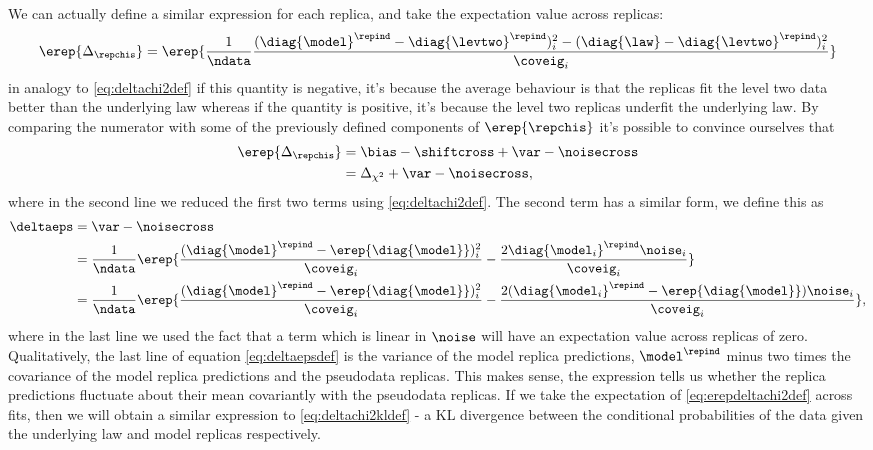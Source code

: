 We can actually define
a similar expression for each replica, and take the expectation value across
replicas:
\begin{equation}\label{eq:erepdeltachi2def}
    \erep{\Delta_{\repchis}} = \erep{\frac{1}{\ndata} \frac{(\diag{\model}^{\repind} - \diag{\levtwo}^{\repind})_i^2 - (\diag{\law} - \diag{\levtwo}^{\repind})_i^2}{\coveig_i}}
\end{equation}
in analogy to \eqref{eq:deltachi2def} if this quantity is negative, it's because
the average behaviour is that the replicas fit the level two data better than
the underlying law whereas if the quantity is positive, it's because the
level two replicas underfit the underlying law. By comparing the numerator with
some of the previously defined components of $\erep{\repchis}$ it's possible to
convince ourselves that
\begin{equation}
    \begin{split}
        \erep{\Delta_{\repchis}} &= \bias - \shiftcross + \var - \noisecross \\
        &= \Delta_{\chi^2} + \var - \noisecross,
    \end{split}
\end{equation}
where in the second line we reduced the first two terms using
\eqref{eq:deltachi2def}. The second term has a similar form, we define this as
\begin{equation}\label{eq:deltaepsdef}
    \begin{split}
        \deltaeps &= \var - \noisecross \\
        &= \frac{1}{\ndata}\erep{ \frac{(\diag{\model}^{\repind} - \erep{\diag{\model}})_i^2}{\coveig_i}
        - \frac{2\diag{\model_i}^{\repind} \noise_i}{\coveig_i}} \\
        &= \frac{1}{\ndata}\erep{ \frac{(\diag{\model}^{\repind} - \erep{\diag{\model}})_i^2}{\coveig_i}
        - \frac{2(\diag{\model_i}^{\repind} - \erep{\diag{\model}}) \noise_i}{\coveig_i}},
    \end{split}
\end{equation}
where in the last line we used the fact that a term which is linear in $\noise$
will have an expectation value across replicas of zero. Qualitatively, the last
line of equation \eqref{eq:deltaepsdef} is the variance of the model replica
predictions, $\model^{\repind}$ minus two times the covariance of the model
replica predictions and the pseudodata replicas. This makes sense, the expression
tells us whether the replica predictions fluctuate about their mean covariantly
with the pseudodata replicas. If we take the expectation of \eqref{eq:erepdeltachi2def}
across fits, then we will obtain a similar expression to
\eqref{eq:deltachi2kldef} - a KL divergence between the conditional probabilities
of the data given the underlying law and model replicas respectively.

